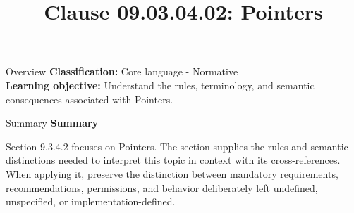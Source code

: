 \documentclass[10pt,letterpaper]{article}
\title{Clause 09.03.04.02: Pointers}
\author{}
\date{}
\begin{document}
\maketitle
\begin{CornellOverviewBox}{Overview}
\textbf{Classification:} Core language - Normative\\[2pt]
\textbf{Learning objective:} Understand the rules, terminology, and semantic consequences associated with Pointers.
\end{CornellOverviewBox}\begin{CornellSummaryBox}{Summary}
{\sffamily\bfseries\color{Accent} Summary}\par\vspace{3pt}Section 9.3.4.2 focuses on Pointers. The section supplies the rules and semantic distinctions needed to interpret this topic in context with its cross-references. When applying it, preserve the distinction between mandatory requirements, recommendations, permissions, and behavior deliberately left undefined, unspecified, or implementation-defined.
\end{CornellSummaryBox}
\end{document}
